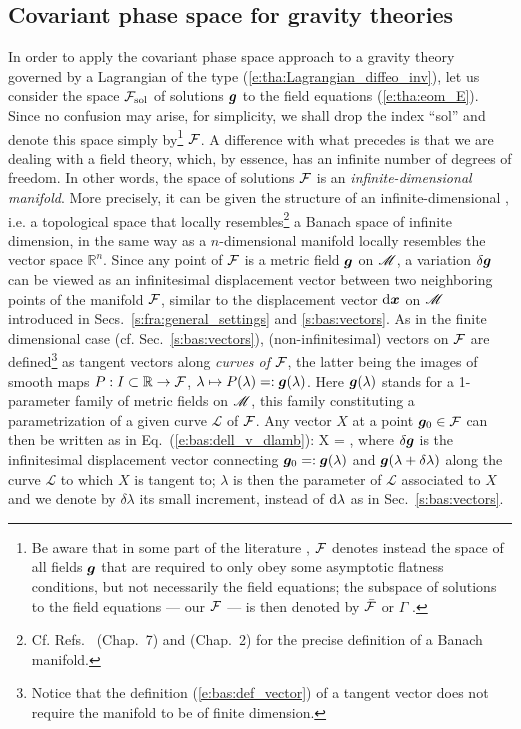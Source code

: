 \subsection{Covariant phase space for gravity theories} \label{s:tha:cps_gravity}

In order to apply the covariant phase space approach to
a gravity theory governed by a Lagrangian of the type (\ref{e:tha:Lagrangian_diffeo_inv}),
let us consider the
space $\mathcal{F}_{\rm sol}$ of solutions $\bm{g}$ to the field equations
(\ref{e:tha:eom_E}). Since no confusion may arise, for simplicity,
we shall drop the index ``sol'' and denote this space simply by\footnote{Be aware that in
some part of the
literature \cite{AshteBR91,LeeW90,WaldZ00}, $\mathcal{F}$ denotes instead the space of all fields $\bm{g}$
that are required to only obey some asymptotic flatness conditions, but not necessarily the field equations;
the subspace of solutions to the field equations --- our $\mathcal{F}$ --- is then denoted
by $\bar{\mathcal{F}}$ \cite{LeeW90,WaldZ00} or $\Gamma$ \cite{AshteBR91}.} $\mathcal{F}$.
A difference with what precedes is that
we are dealing with a field theory, which, by essence, has
an infinite number of degrees of freedom. In other words,
the space of solutions $\mathcal{F}$ is
an \emph{infinite-dimensional manifold}. More precisely, it can be given the structure of an
infinite-dimensional 
\cite{LeeW90,HarloW20}, i.e. a topological space that locally resembles\footnote{Cf. Refs.~\cite{ChoquDD82} (Chap.~7) and \cite{Lang95} (Chap.~2) for the
precise definition of a Banach manifold.} a Banach space of infinite dimension, in the same
way as a $n$-dimensional manifold locally resembles the vector space $\mathbb{R}^n$.
Since any point of $\mathcal{F}$ is a metric field $\bm{g}$ on $\mathscr{M}$, a variation $\delta\bm{g}$
can be viewed as an infinitesimal displacement vector between two neighboring points of the manifold
$\mathcal{F}$, similar to the displacement vector $\mathrm{d}\bm{x}$ on $\mathscr{M}$ introduced in Secs.~\ref{s:fra:general_settings} and \ref{s:bas:vectors}.
As in the finite dimensional case
(cf. Sec.~\ref{s:bas:vectors}), (non-infinitesimal) vectors on $\mathcal{F}$
are defined\footnote{Notice that the definition (\ref{e:bas:def_vector}) of a tangent vector
does not require the manifold to be of finite dimension.} as tangent vectors
along \emph{curves of} $\mathcal{F}$, the latter being the images of smooth maps
$P: I\subset \mathbb{R} \to  \mathcal{F}$, $\lambda\mapsto P(\lambda) =: \bm{g}(\lambda)$. Here
$\bm{g}(\lambda)$ stands for a 1-parameter family of metric fields
on $\mathscr{M}$, this family constituting a parametrization of a given curve $\mathcal{L}$ of $\mathcal{F}$.
Any vector $X$ at a point $\bm{g}_0 \in \mathcal{F}$ can then be written as in Eq.~(\ref{e:bas:dell_v_dlamb}):
\be \label{e:tha:X_dg/dlambda}
    X =  ,
\ee
where $\delta\bm{g}$ is the infinitesimal displacement vector connecting $\bm{g}_0 =: \bm{g}(\lambda)$
and $\bm{g}(\lambda+\delta\lambda)$ along the curve $\mathcal{L}$
to which $X$ is tangent to; $\lambda$ is then the parameter of $\mathcal{L}$ associated to $X$
and we denote by $\delta\lambda$ its small increment, instead of $\mathrm{d}\lambda$ as in Sec.~\ref{s:bas:vectors}.


